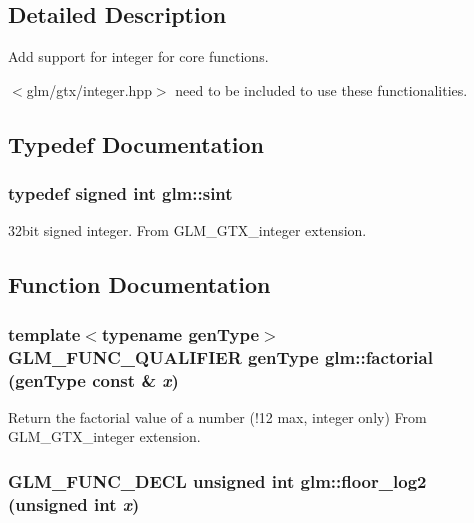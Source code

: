\subsection{Detailed Description}
Add support for integer for core functions. 

$<$glm/gtx/integer.hpp$>$ need to be included to use these functionalities. 

\subsection{Typedef Documentation}
\hypertarget{group__gtx__integer_g73643e09d8c6d362418aec541fdb987d}{
\subsubsection[sint]{\setlength{\rightskip}{0pt plus 5cm}typedef signed int {\bf glm::sint}}}
\label{group__gtx__integer_g73643e09d8c6d362418aec541fdb987d}


32bit signed integer. From GLM\_\-GTX\_\-integer extension. 

\subsection{Function Documentation}
\hypertarget{group__gtx__integer_g57ba2a6a2729f23ba4848bbad551dcd1}{
\subsubsection[factorial]{\setlength{\rightskip}{0pt plus 5cm}template$<$typename genType$>$ GLM\_\-FUNC\_\-QUALIFIER genType glm::factorial (genType const \& {\em x})}}
\label{group__gtx__integer_g57ba2a6a2729f23ba4848bbad551dcd1}


Return the factorial value of a number (!12 max, integer only) From GLM\_\-GTX\_\-integer extension. \hypertarget{group__gtx__integer_g7011b4e1c1e1ed492149b028feacc00e}{
\subsubsection[floor\_\-log2]{\setlength{\rightskip}{0pt plus 5cm}GLM\_\-FUNC\_\-DECL unsigned int glm::floor\_\-log2 (unsigned int {\em x})}}
\label{group__gtx__integer_g7011b4e1c1e1ed492149b028feacc00e}


